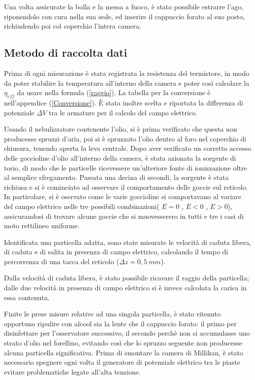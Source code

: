\documentclass{article}
\begin{document}
Una volta assicurate la bolla e la messa a fuoco, è stato possibile estrarre l'ago, riponendolo con cura nella sua sede, ed inserire il cappuccio forato al suo posto, richiudendo poi col coperchio l'intera camera.
\subsection{Metodo di raccolta dati}
Prima di ogni misurazione è stata registrata la resistenza del termistore, in modo da poter stabilire la temperatura all'interno della camera e poter così calcolare la $\eta_{eff}$ da usare nella formula (\ref{raggio}). La tabella per la conversione è nell'appendice (\ref{Conversione}). \`E  stata inoltre scelta e riportata la differenza di potenziale $\Delta V$ tra le armature per il calcolo del campo elettrico.

Usando il nebulizzatore contenente l'olio, si è prima verificato che questa non producesse spruzzi d'aria, poi si è spruzzato l'olio dentro al foro nel coperchio di chiusura, tenendo aperta la leva centrale. Dopo aver verificato un corretto accesso delle goccioline d'olio all'interno della camera, è stata azionata la sorgente di torio, di modo che le particelle ricevessere un'ulteriore fonte di ionizzazione oltre al semplice sfregamento. Passata una decina di secondi, la sorgente è stata richiusa e si è cominciato ad osservare il comportamento delle goccie sul reticolo. In particolare, si è oservato come le varie goccioline si comportavano al variare del campo elettrico nelle tre possibili combinazioni( $E=0$ , $E<0$ , $E>0$), assicurandosi di trovare alcune goccie che si muovesserero in tutti e tre i casi di moto rettilineo uniforme. 

Identificata una particella adatta, sono state misurate le velocità di caduta libera, di caduta e di salita in presenza di campo elettrico, calcolando il tempo di percorrenza di una tacca del reticolo ($\Delta z=0,5\ mm$).

Dalla velocità di caduta libera, è stato possibile ricavare il raggio della particella; dalle due velocità in presenza di campo elettrico si è invece calcolata la carica in essa contenuta.


Finite le prese misure relative ad una singola particella, è stato ritenuto opportuno ripulire con alcool sia la lente che il cappuccio forato: il primo per disinfettare per l'osservatore successivo, il secondo perchè non si accumulasse uno strato d'olio nel forellino, evitando così che lo spruzzo seguente non producesse alcuna particella significativa. Prima di smontare la camera di Millikan, è stato necessario spegnere ogni volta il generatore di potenziale elettrico tra le piaste evitare problematiche legate all'alta tensione. 
\newpage
\end{document}
